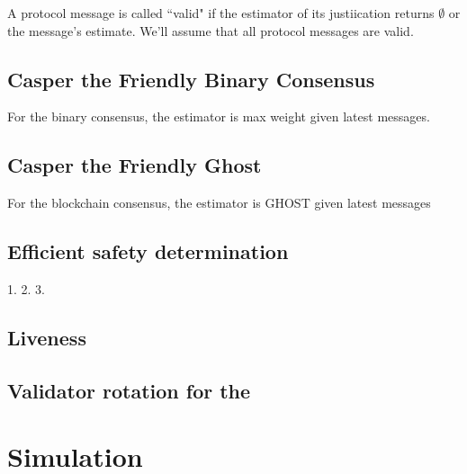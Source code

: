 \documentclass{article}
\theoremstyle{definition}
\begin{document}
A protocol message is called ``valid" if the estimator of its justiication returns $\emptyset$ or the message's estimate. We'll assume that all protocol messages are valid.

\subsection{Casper the Friendly Binary Consensus}

For the binary consensus, the estimator is max weight given latest messages.

\subsection{Casper the Friendly Ghost}

For the blockchain consensus, the estimator is GHOST given latest messages


\subsection{Efficient safety determination}

1.
2.
3.

\subsection{Liveness}

\subsection{Validator rotation for the }

\section{Simulation}


\fi



\iffalse
\end{document}
